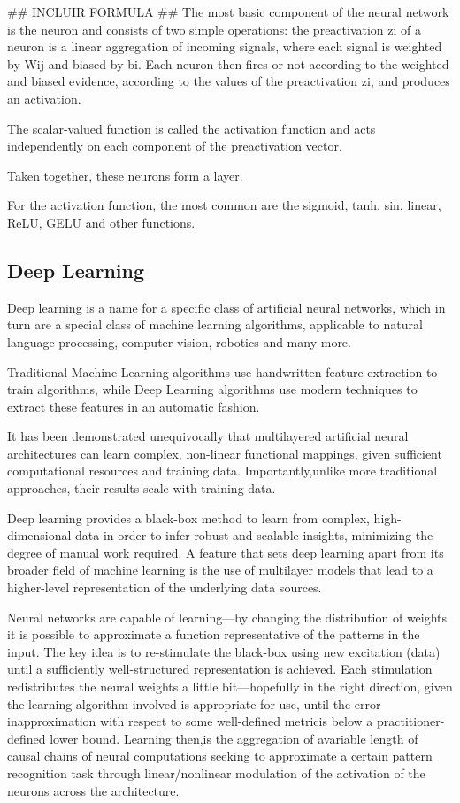 ## INCLUIR FORMULA ## 
The most basic component of the neural network is the neuron and consists of two simple operations: the preactivation zi of a neuron is a linear aggregation of incoming signals, where each signal is weighted by Wij and biased by bi. Each neuron then fires or not according to the weighted and biased evidence, according to the values of the preactivation zi, and produces an activation.

The scalar-valued function is called the activation function and acts independently on each component of the preactivation vector. 

Taken together, these neurons form a layer.\cite{rfc27}

For the activation function, the most common are the sigmoid, tanh, sin, linear, ReLU, GELU and other functions.

\subsection{Deep Learning}

Deep learning is a name for a specific class of artificial neural networks, which in turn are a special class of machine learning algorithms, applicable to natural language processing, computer vision, robotics and many more.\cite{rfc22}

Traditional Machine Learning algorithms use handwritten feature extraction to train algorithms, while Deep Learning algorithms use modern techniques to extract these features in an automatic fashion.\cite{rfc23}

It has been demonstrated unequivocally that multilayered artificial neural architectures can learn complex, non-linear functional mappings, given sufficient computational resources and training data. Importantly,unlike more traditional approaches, their results scale with training data.\cite{rfc24}

Deep learning provides a black-box method to learn from complex, high-dimensional data in order to infer robust and scalable insights, minimizing the degree of manual work required\cite{rfc23}. A feature that sets deep learning apart from its broader field of machine learning is the use of multilayer models that lead to a higher-level representation of the underlying data sources\cite{rfc24}.

Neural networks are capable of learning—by changing the distribution of weights it is possible to approximate a function representative of the patterns in the input. The key idea is to re-stimulate the black-box using new excitation (data) until a sufficiently well-structured representation is achieved. Each stimulation redistributes the neural weights a little bit—hopefully in the right direction, given the learning algorithm involved is appropriate for use, until the error inapproximation with respect to some well-defined metricis below a practitioner-defined lower bound. Learning then,is the aggregation of avariable length of causal chains of neural computations\cite{rfc26} seeking to approximate a certain pattern recognition task through linear/nonlinear modulation of the activation of the neurons across the architecture.

